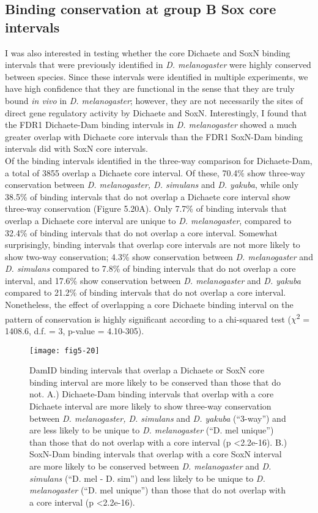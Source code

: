 \subsection{Binding conservation at group B Sox core intervals}
I was also interested in testing whether the core Dichaete and SoxN binding intervals that were previously identified in \emph{D. melanogaster} were highly conserved between species. Since these intervals were identified in multiple experiments, we have high confidence that they are functional in the sense that they are truly bound \emph{in vivo} in \emph{D. melanogaster}; however, they are not necessarily the sites of direct gene regulatory activity by Dichaete and SoxN. Interestingly, I found that the FDR1 Dichaete-Dam binding intervals in \emph{D. melanogaster} showed a much greater overlap with Dichaete core intervals than the FDR1 SoxN-Dam binding intervals did with SoxN core intervals.\\

Of the binding intervals identified in the three-way comparison for Dichaete-Dam, a total of 3855 overlap a Dichaete core interval. Of these, 70.4\% show three-way conservation between \emph{D. melanogaster, D. simulans} and \emph{D. yakuba}, while only 38.5\% of binding intervals that do not overlap a Dichaete core interval show three-way conservation (Figure 5.20A). Only 7.7\% of binding intervals that overlap a Dichaete core interval are unique to \emph{D. melanogaster}, compared to 32.4\% of binding intervals that do not overlap a core interval. Somewhat surprisingly, binding intervals that overlap core intervals are not more likely to show two-way conservation; 4.3\% show conservation between \emph{D. melanogaster} and \emph{D. simulans} compared to 7.8\% of binding intervals that do not overlap a core interval, and 17.6\% show conservation between \emph{D. melanogaster} and \emph{D. yakuba} compared to 21.2\% of binding intervals that do not overlap a core interval. Nonetheless, the effect of overlapping a core Dichaete binding interval on the pattern of conservation is highly significant according to a chi-squared test (\(\chi\)\textsuperscript{2} = 1408.6, d.f. = 3, p-value = 4.10-305).\\

\begin{figure}
\centering
\texttt{[image: fig5-20]}
\caption{DamID binding intervals that overlap a Dichaete or SoxN core binding interval are more likely to be conserved than those that do not. A.) Dichaete-Dam binding intervals that overlap with a core Dichaete interval are more likely to show three-way conservation between \emph{D. melanogaster, D. simulans} and \emph{D. yakuba} (“3-way”) and are less likely to be unique to \emph{D. melanogaster}  (“D. mel unique”) than those that do not overlap with a core interval (p \textless 2.2e-16). B.) SoxN-Dam binding intervals that overlap with a core SoxN interval are more likely to be conserved between \emph{D. melanogaster} and \emph{D. simulans} (“D. mel - D. sim”) and less likely to be unique to \emph{D. melanogaster} (“D. mel unique”) than those that do not overlap with a core interval (p \textless 2.2e-16).}
\label{Figure 5.20}
\end{figure}

